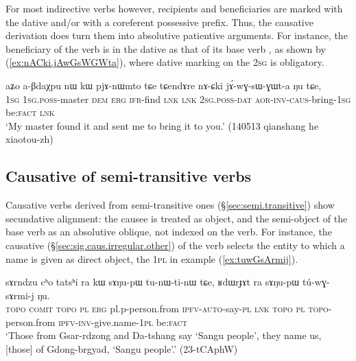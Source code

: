For most indirective verbs however, recipients and beneficiaries are marked with the dative and/or with a coreferent possessive prefix. Thus, the causative derivation does turn them into absolutive patientive arguments. For instance, the beneficiary of the verb  is in the dative as that of its base verb , as shown by (\ref{ex:nACki.jAwGsWGWta}), where dative marking on the \textsc{2sg} is obligatory.

\begin{exe}
	\ex \label{ex:nACki.jAwGsWGWta}
	\gll   aʑo a-βdaχpu nɯ kɯ pjɤ-nɯmto tɕe tɕendɤre nɤ-ɕki jɤ́-wɣ-sɯ-ɣɯt-a ŋu tɕe, \\
	\textsc{1sg} \textsc{1sg}.\textsc{poss}-master \textsc{dem} \textsc{erg} \textsc{ifr}-find \textsc{lnk} \textsc{lnk} \textsc{2sg}.\textsc{poss}-\textsc{dat} \textsc{aor}-\textsc{inv}-\textsc{caus}-bring-\textsc{1sg} be:\textsc{fact} \textsc{lnk} \\
	\glt `My master found it and sent me to bring it to you.' (140513 qianshang he xiaotou-zh)
\end{exe}


\subsection{Causative of semi-transitive verbs} \label{sec:semi.transitive.causative}
    
Causative verbs derived from semi-transitive ones (§\ref{sec:semi.transitive}) show secundative alignment: the causee is treated as object, and the semi-object of the base verb as an absolutive oblique, not indexed on the verb. For instance, the causative  (§\ref{sec:sig.caus.irregular.other}) of the verb  selects the entity to which a name is given as direct object, the \textsc{1pl} in example (\ref{ex:tuwGsArmij}).

\begin{exe}
	\ex \label{ex:tuwGsArmij}
	\gll   sɤrndzu cʰo tatsʰi ra kɯ sɤŋu-pɯ tu-nɯ-ti-nɯ tɕe, ʁdɯrɟɤt ra sɤŋu-pɯ tú-wɣ-sɤrmi-j ŋu. \\
	\textsc{topo} \textsc{comit}  \textsc{topo} \textsc{pl} \textsc{erg} pl.p-person.from \textsc{ipfv}-\textsc{auto}-say-\textsc{pl} \textsc{lnk} \textsc{topo} \textsc{pl} \textsc{topo}-person.from \textsc{ipfv}-\textsc{inv}-give.name-\textsc{1pl} be:\textsc{fact} \\
	\glt `Those from Gsar-rdzong and Da-tshang say `Sangu people', they name us, [those] of Gdong-brgyad, `Sangu people'.' (23-tCAphW)
\end{exe}


